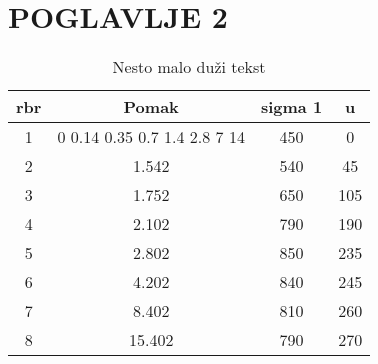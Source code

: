 \chapter{\uppercase{Poglavlje 2}}


\lipsum[1-3]


\begin{table}
	\centering
	\caption{Nesto malo duži tekst}
	\label{tab:red}
	\begin{tabular}{c c c c}
		\hline
		rbr & Pomak & sigma 1 & u \\ \hline
		1 & 0 0.14 0.35 0.7 1.4 2.8 7 14 & 450 & 0 \\ \hline
		2 & 1.542 & 540 & 45 \\ \hline
		3 & 1.752 & 650 & 105 \\ \hline
		4 & 2.102 & 790 & 190 \\ \hline
		5 & 2.802 & 850 & 235 \\ \hline
		6 & 4.202 & 840 & 245 \\ \hline
		7 & 8.402 & 810 & 260 \\ \hline
		8 & 15.402 & 790 & 270 \\ \hline
	\end{tabular}
\end{table}


\lipsum[1-3] \cite{Massoudi2001}